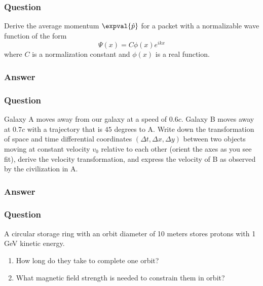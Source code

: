 \subsubsection{Question}
Derive the average momentum $\expval{\hat{p}}$ for a packet with a normalizable wave function of the form $$\Psi(x) = C\phi(x)e^{ikx}$$ where $C$ is a normalization constant and $\phi(x)$ is a real function.
\subsubsection{Answer}



\subsubsection{Question}
Galaxy A moves away from our galaxy at a speed of $0.6c$. Galaxy B moves away at $0.7c$ with a trajectory that is $45$ degrees to A. Write down the transformation of space and time differential coordinates $({\Delta}t, {\Delta}x, {\Delta}y)$ between two objects moving at constant velocity $v_0$ relative to each other (orient the axes as you see fit), derive the velocity transformation, and express the velocity of B as observed by the civilization in A.
\subsubsection{Answer}

\subsubsection{Question}
A circular storage ring with an orbit diameter of 10 meters stores protons with 1 GeV kinetic energy.
\begin{enumerate}
	\item How long do they take to complete one orbit?
	\item What magnetic field strength is needed to constrain them in orbit?
\end{enumerate}
